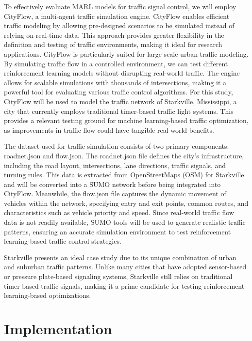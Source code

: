 \documentclass[conference]{IEEEtran}
\begin{document}
To effectively evaluate MARL models for traffic signal control, we will employ CityFlow, a multi-agent traffic simulation engine. CityFlow enables efficient traffic modeling by allowing pre-designed scenarios to be simulated instead of relying on real-time data. This approach provides greater flexibility in the definition and testing of traffic environments, making it ideal for research applications. CityFlow is particularly suited for large-scale urban traffic modeling. By simulating traffic flow in a controlled environment, we can test different reinforcement learning models without disrupting real-world traffic. The engine allows for scalable simulations with thousands of intersections, making it a powerful tool for evaluating various traffic control algorithms. For this study, CityFlow will be used to model the traffic network of Starkville, Mississippi, a city that currently employs traditional timer-based traffic light systems. This provides a relevant testing ground for machine learning-based traffic optimization, as improvements in traffic flow could have tangible real-world benefits.

The dataset used for traffic simulation consists of two primary components: roadnet.json and flow.json. The roadnet.json file defines the city's infrastructure, including the road layout, intersections, lane directions, traffic signals, and turning rules. This data is extracted from OpenStreetMaps (OSM) for Starkville and will be converted into a SUMO network before being integrated into CityFlow. Meanwhile, the flow.json file captures the dynamic movement of vehicles within the network, specifying entry and exit points, common routes, and characteristics such as vehicle priority and speed. Since real-world traffic flow data is not readily available, SUMO tools will be used to generate realistic traffic patterns, ensuring an accurate simulation environment to test reinforcement learning-based traffic control strategies.

Starkville presents an ideal case study due to its unique combination of urban and suburban traffic patterns. Unlike many cities that have adopted sensor-based or pressure plate-based signaling systems, Starkville still relies on traditional timer-based traffic signals, making it a prime candidate for testing reinforcement learning-based optimizations.

\section{Implementation}
\end{document}
